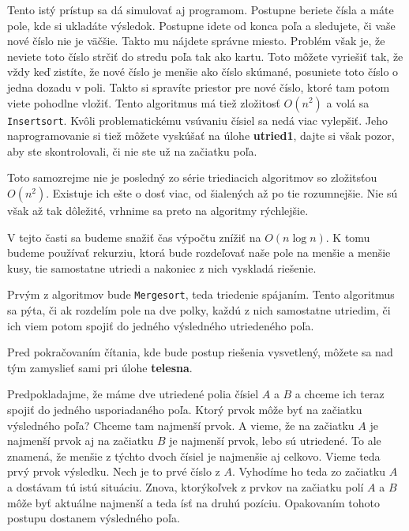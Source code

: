 Tento istý prístup sa dá simulovať aj programom. Postupne beriete čísla a máte pole, kde si ukladáte
výsledok. Postupne idete od konca poľa a sledujete, či vaše nové číslo nie je väčšie. Takto mu
nájdete správne miesto. Problém však je, že neviete toto číslo strčiť do stredu poľa tak ako kartu.
Toto môžete vyriešiť tak, že vždy keď zistíte, že nové číslo je menšie ako číslo skúmané, posuniete
toto číslo o jedna dozadu v poli. Takto si spravíte priestor pre nové číslo, ktoré tam potom viete
pohodlne vložiť. Tento algoritmus má tiež zložitosť $O(n^2)$ a volá sa \texttt{Insertsort}. Kvôli 
problematickému vsúvaniu čísiel sa nedá viac vylepšiť. Jeho naprogramovanie si tiež môžete vyskúšať
na úlohe \textbf{utried1}, dajte si však pozor, aby ste skontrolovali, či nie ste už na začiatku poľa.

Toto samozrejme nie je posledný zo série triediacich algoritmov so zložitsťou $O(n^2)$. Existuje ich
ešte o dosť viac, od šialených až po tie rozumnejšie. Nie sú však až tak dôležité, vrhnime sa preto
na algoritmy rýchlejšie.


V tejto časti sa budeme snažiť čas výpočtu znížiť na $O(n\log n)$. K tomu budeme používať rekurziu,
ktorá bude rozdeľovať naše pole na menšie a menšie kusy, tie samostatne utriedi a nakoniec z nich
vyskladá riešenie.

Prvým z algoritmov bude \texttt{Mergesort}, teda triedenie spájaním. Tento algoritmus sa pýta, či ak
rozdelím pole na dve polky, každú z nich samostatne utriedim, či ich viem potom spojiť do jedného
výsledného utriedeného poľa.

\medskip

Pred pokračovaním čítania, kde bude postup riešenia vysvetlený, môžete sa nad tým zamyslieť sami pri
úlohe \textbf{telesna}.

\medskip

Predpokladajme, že máme dve utriedené polia čísiel $A$ a $B$ a chceme ich teraz spojiť do jedného
usporiadaného poľa. Ktorý prvok môže byť na začiatku výsledného poľa? Chceme tam najmenší prvok. A
vieme, že na začiatku $A$ je najmenší prvok aj na začiatku $B$ je najmenší prvok, lebo sú utriedené.
To ale znamená, že menšie z týchto dvoch čísiel je najmenšie aj celkovo. Vieme teda prvý prvok
výsledku. Nech je to prvé číslo z $A$. Vyhodíme ho teda zo začiatku $A$ a dostávam tú istú situáciu.
Znova, ktorýkoľvek z prvkov na začiatku polí $A$ a $B$ môže byť aktuálne najmenší a teda ísť na
druhú pozíciu. Opakovaním tohoto postupu dostanem výsledného poľa.

